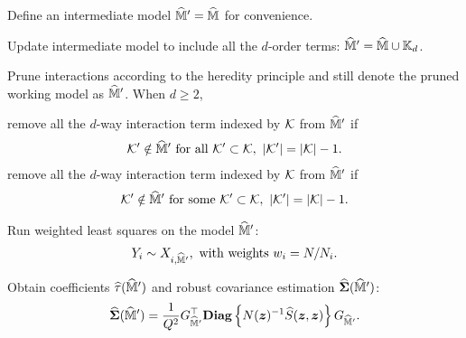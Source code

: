 \documentclass[12pt]{article}
\begin{document}
\begin{algorithm}[!htbp]
\DontPrintSemicolon
{}                %


    
    Define an intermediate model $\widehat{{\mathbb{M}}}' = \widehat{{\mathbb{M}}}$ for convenience.
    
    {
      Update intermediate model to include all the $d$-order terms: $\widehat{{\mathbb{M}}}' = \widehat{{\mathbb{M}}} \cup {\mathbb{K}}_d$.
        
      Prune interactions according to the heredity principle and still denote the pruned working model as $\widehat{{\mathbb{M}}}'$. When $d\ge 2$,
      
      {
        remove all the $d$-way interaction term indexed by ${\mathcal{K}}$ from $\widehat{{\mathbb{M}}}'$ if 
       \begin{align*}
           {\mathcal{K}}'\notin \widehat{{\mathbb{M}}}' \text{ for all }{\mathcal{K}}'\subset{\mathcal{K}},~|{\mathcal{K}}'| = |{\mathcal{K}}| - 1.
       \end{align*}
      }
      {
        remove all the $d$-way interaction term indexed by ${\mathcal{K}}$ from $\widehat{{\mathbb{M}}}'$ if 
       \begin{align*}
           {\mathcal{K}}'\notin \widehat{{\mathbb{M}}}' \text{ for some }{\mathcal{K}}'\subset{\mathcal{K}},~|{\mathcal{K}}'| = |{\mathcal{K}}| - 1.
       \end{align*}
      }
      
      
      Run weighted least squares on the model $\widehat{{\mathbb{M}}}'$:
       \begin{align*}
          Y_i \sim X_{i, \widehat{{\mathbb{M}}}'}, \text{ with weights } w_i = N/N_i.
       \end{align*}
    
      Obtain coefficients $\widehat{\tau}(\widehat{{\mathbb{M}}}')$ and robust covariance estimation $\widehat{{\boldsymbol{\Sigma}}}(\widehat{{\mathbb{M}}}')$:
      \begin{align*}
          \widehat{{\boldsymbol{\Sigma}}}(\widehat{{\mathbb{M}}}') = \frac{1}{Q^2}G_{\widehat{{\mathbb{M}}}'}^\top \text{\bfseries Diag}\left\{N({\boldsymbol{z}})^{-1}{\widehat{S}}({\boldsymbol{z}},{\boldsymbol{z}})\right\} G_{\widehat{{\mathbb{M}}}'}.
      \end{align*}

}
\end{algorithm}
\end{document}

